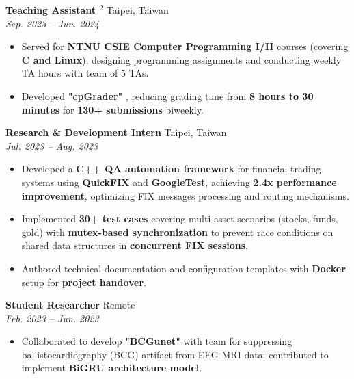 \documentclass[a4paper,11pt]{article}
\begin{document}
\noindent \textbf{Teaching Assistant \hyperlink{award2}{\color{textcolor}\raisebox{0pt}{}$^{2}$}} \hfill Taipei, Taiwan\\
 \hfill \textit{Sep. 2023 -- Jun. 2024}
\begin{itemize}
    \item Served for \textbf{NTNU CSIE Computer Programming I/II} courses (covering \textbf{C and Linux}), designing programming assignments and conducting weekly TA hours with team of 5 TAs.
    \item Developed \textbf{"cpGrader"} \href{https://github.com/ryanlinjui/cpGrader}{\color{textcolor}\raisebox{0pt}{}}, reducing grading time from \textbf{8 hours to 30 minutes} for \textbf{130+ submissions} biweekly.
\end{itemize}
\vspace{0.25em}

\noindent \textbf{Research \& Development Intern} \hfill Taipei, Taiwan\\
 \hfill \textit{Jul. 2023 -- Aug. 2023}
\begin{itemize}
    \item Developed a \textbf{C++ QA automation framework} for financial trading systems using \textbf{QuickFIX} and \textbf{GoogleTest}, achieving \textbf{2.4x performance improvement}, optimizing FIX messages processing and routing mechanisms.
    \item Implemented \textbf{30+ test cases} covering multi-asset scenarios (stocks, funds, gold) with \textbf{mutex-based synchronization} to prevent race conditions on shared data structures in \textbf{concurrent FIX sessions}.
    \item Authored technical documentation and configuration templates with \textbf{Docker} setup for \textbf{project handover}.
\end{itemize}
\vspace{0.25em}

\noindent \textbf{Student Researcher} \hfill Remote\\
 \hfill \textit{Feb. 2023 -- Jun. 2023}
\begin{itemize}
    \item Collaborated to develop \textbf{"BCGunet"} \href{https://github.com/fahsuanlin/BCGunet}{\color{textcolor}\raisebox{0pt}{}} with team for suppressing ballistocardiography (BCG) artifact from EEG-MRI data; contributed to implement \textbf{BiGRU architecture model}.
\end{itemize}
\end{document}
